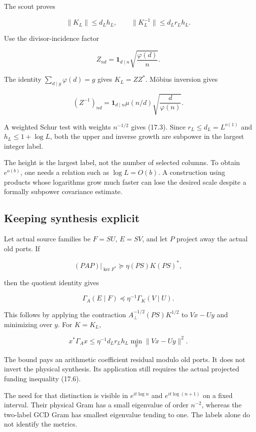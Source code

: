 \documentclass[
  10pt,
  a4paper,
  10pt,
  oneside,
  openany]{book}
\begin{document}
The scout proves

\[
\|K_L\|\le d_Lh_L,
\qquad
\|K_L^{-1}\|\le d_Lr_Lh_L.
\tag{17.3}\label{eq:17.3}
\]

Use the divisor-incidence factor

\[
Z_{nd}=\mathbf1_{d\mid n}\sqrt{\frac{\varphi(d)}n}.
\tag{17.4}\label{eq:17.4}
\]

The identity \(\sum_{d\mid g}\varphi(d)=g\) gives \(K_L=ZZ^*\). Möbius
inversion gives

\[
(Z^{-1})_{nd}=\mathbf1_{d\mid n}\mu(n/d)\sqrt{\frac d{\varphi(n)}}.
\tag{17.5}\label{eq:17.5}
\]

A weighted Schur test with weights \(n^{-1/2}\) gives (17.3). Since
\(r_L\le d_L=L^{o(1)}\) and \(h_L\le1+\log L\), both the upper and
inverse growth are subpower in the largest integer label.

The height is the largest label, not the number of selected columns. To
obtain \(e^{o(b)}\), one needs a relation such as \(\log L=O(b)\). A
construction using products whose logarithms grow much faster can lose
the desired scale despite a formally subpower covariance estimate.

\subsection{Keeping synthesis
explicit}\label{keeping-synthesis-explicit}

Let actual source families be \(F=SU\), \(E=SV\), and let \(P\) project
away the actual old ports. If

\[
(PAP)|_{\ker F^*}\succeq\eta(PS)K(PS)^*,
\tag{17.6}\label{eq:17.6}
\]

then the quotient identity gives

\[
\Gamma_A(E\mid F)\preceq\eta^{-1}\Gamma_K(V\mid U).
\tag{17.7}\label{eq:17.7}
\]

This follows by applying the contraction \(A_\perp^{-1/2}(PS)K^{1/2}\)
to \(Vx-Uy\) and minimizing over \(y\). For \(K=K_L\),

\[
x^*\Gamma_Ax
\le\eta^{-1}d_Lr_Lh_L\min_y\|Vx-Uy\|^2.
\tag{17.8}\label{eq:17.8}
\]

The bound pays an arithmetic coefficient residual modulo old ports. It
does not invert the physical synthesis. Its application still requires
the actual projected funding inequality (17.6).

The need for that distinction is visible in \(e^{it\log n}\) and
\(e^{it\log(n+1)}\) on a fixed interval. Their physical Gram has a small
eigenvalue of order \(n^{-2}\), whereas the two-label GCD Gram has
smallest eigenvalue tending to one. The labels alone do not identify the
metrics.
\end{document}
